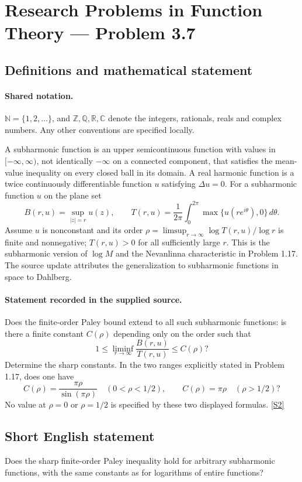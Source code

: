 \documentclass[11pt]{article}
\newcommand{\sref}[2]{\hyperlink{source:#1:#2}{[S#2]}}
\begin{document}
\section{Research Problems in Function Theory — Problem 3.7}\label{statement}

\subsection{Definitions and mathematical statement}

\paragraph{Shared notation.}$\mathbb N=\{1,2,\ldots\}$, and $\mathbb Z,\mathbb Q,\mathbb R,\mathbb C$ denote the integers, rationals, reals and complex numbers. Any other conventions are specified locally.


A subharmonic function is an upper semicontinuous function with values in $[-\infty,\infty)$, not identically $-\infty$ on a connected component, that satisfies the mean-value inequality on every closed ball in its domain. A real harmonic function is a twice continuously differentiable function $u$ satisfying $\Delta u=0$. For a subharmonic function $u$ on the plane set
\[B(r,u)=\sup_{|z|=r}u(z),\qquad T(r,u)=\frac1{2\pi}\int_0^{2\pi}\max\{u(re^{i\theta}),0\}\,d\theta.\]
Assume $u$ is nonconstant and its order $\rho=\limsup_{r\to\infty}\log T(r,u)/\log r$ is finite and nonnegative; $T(r,u)>0$ for all sufficiently large $r$. This is the subharmonic version of $\log M$ and the Nevanlinna characteristic in Problem 1.17.
The source update attributes the generalization to subharmonic functions in space to Dahlberg.
\paragraph{Statement recorded in the supplied source.}
Does the finite-order Paley bound extend to all such subharmonic functions: is there a finite constant $C(\rho)$ depending only on the order such that
\[1\leq\liminf_{r\to\infty}\frac{B(r,u)}{T(r,u)}\leq C(\rho)?\]
Determine the sharp constants. In the two ranges explicitly stated in Problem 1.17, does one have
\[C(\rho)=\frac{\pi\rho}{\sin(\pi\rho)}\quad(0<\rho<1/2),\qquad C(\rho)=\pi\rho\quad(\rho>1/2)?\]
No value at $\rho=0$ or $\rho=1/2$ is specified by these two displayed formulas. \sref{statement}{2}
\subsection{Short English statement}
Does the sharp finite-order Paley inequality hold for arbitrary subharmonic functions, with the same constants as for logarithms of entire functions?
\end{document}
